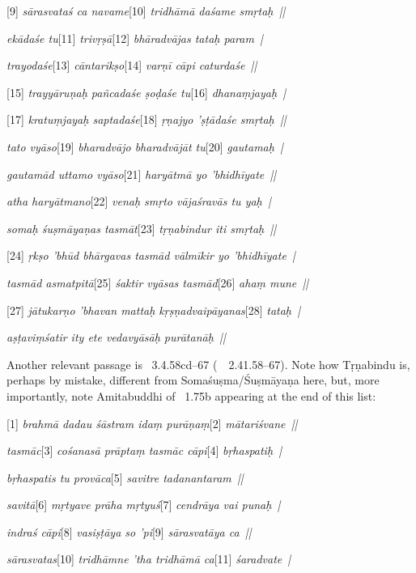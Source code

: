 {{  [9]\textit{ sārasvataś ca navame}[10]\textit{ tridhāmā daśame smṛtaḥ~||} 
 
  \textit{ekādaśe tu}[11]\textit{ trivṛṣā}[12]\textit{ bhāradvājas tataḥ param~|} 
 
  \textit{trayodaśe}[13]\textit{ cāntarikṣo}[14]\textit{ varṇī cāpi caturdaśe~||} 
 
  [15]\textit{ trayyāruṇaḥ pañcadaśe ṣoḍaśe tu}[16]\textit{ dhanaṃjayaḥ~|} 
 
  [17]\textit{ kratuṃjayaḥ saptadaśe}[18]\textit{ ṛṇajyo 'ṣṭādaśe smṛtaḥ~||} 
 
  \textit{tato vyāso}[19]\textit{ bharadvājo bharadvājāt tu}[20]\textit{ gautamaḥ~|} 
 
  \textit{gautamād uttamo vyāso}[21]\textit{ haryātmā yo 'bhidhīyate~||} 
 
  \textit{atha haryātmano}[22]\textit{ venaḥ smṛto vājaśravās tu yaḥ~|} 
 
  \textit{somaḥ śuṣmāyaṇas tasmāt}[23]\textit{ tṛṇabindur iti smṛtaḥ~||} 
 
  [24]\textit{ ṛkṣo 'bhūd bhārgavas tasmād vālmīkir yo 'bhidhīyate~|} 
 
  \textit{tasmād asmatpitā}[25]\textit{ śaktir vyāsas tasmād}[26]\textit{ ahaṃ mune~||} 
 
  [27]\textit{ jātukarṇo 'bhavan mattaḥ kṛṣṇadvaipāyanas}[28]\textit{ tataḥ~|} 
 
  \textit{aṣṭaviṃśatir ity ete vedavyāsāḥ purātanāḥ~||}
 
  
 
  Another relevant passage is \BrahmandaPur\ 3.4.58cd--67 {\rm (}\similar\ \VAYUP\ 2.41.58--67{\rm )}.
  Note how Tṛṇabindu is, perhaps by mistake, different from Somaśuṣma/Śuṣmāyaṇa here,
  but, more importantly, note Amitabuddhi of \VSS\ 1.75b appearing at the end of this list:
  
 
  [1] \textit{brahmā dadau śāstram idaṃ purāṇaṃ}[2]\textit{ mātariśvane~||} 
 
  \textit{tasmāc}[3]\textit{ cośanasā prāptaṃ tasmāc cāpi}[4]\textit{ bṛhaspatiḥ~|} 
 
  \textit{bṛhaspatis tu provāca}[5]\textit{ savitre tadanantaram~||} 
 
  \textit{savitā}[6]\textit{ mṛtyave prāha mṛtyuś}[7]\textit{ cendrāya vai punaḥ~|} 
 
  \textit{indraś cāpi}[8]\textit{ vasiṣṭāya so 'pi}[9]\textit{ sārasvatāya ca~||} 
 
  \textit{sārasvatas}[10]\textit{ tridhāmne 'tha tridhāmā ca}[11]\textit{ śaradvate~|} 
 
}}
